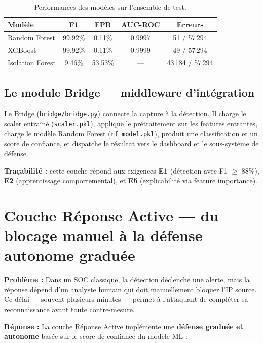 \documentclass[12pt,a4paper]{article}
\newcommand{\problem}{\textcolor{accentred}{\textbf{Probl\`{e}me : }}}
\newcommand{\answer}{\textcolor{accentgreen}{\textbf{R\'{e}ponse : }}}
\begin{document}
\begin{table}[h!]
\centering
\small
\begin{tabular}{lcccc}
\toprule
\textbf{Mod\`{e}le} & \textbf{F1} & \textbf{FPR} & \textbf{AUC-ROC} & \textbf{Erreurs} \\
\midrule
Random Forest & 99.92\% & 0.11\% & 0.9997 & 51 / 57\,294 \\
XGBoost       & 99.92\% & 0.11\% & 0.9999 & 49 / 57\,294 \\
Isolation Forest & 9.46\% & 53.53\% & --- & 43\,184 / 57\,294 \\
\bottomrule
\end{tabular}
\caption{Performances des mod\`{e}les sur l'ensemble de test.}
\end{table}

\subsection{Le module Bridge --- middleware d'int\'{e}gration}

Le Bridge (\texttt{bridge/bridge.py}) connecte la capture \`{a} la d\'{e}tection.
Il charge le scaler entra\^{i}n\'{e} (\texttt{scaler.pkl}), applique le
pr\'{e}traitement sur les features entrantes, charge le mod\`{e}le Random Forest
(\texttt{rf\_model.pkl}), produit une classification et un score de confiance,
et dispatche le r\'{e}sultat vers le dashboard et le sous-syst\`{e}me de d\'{e}fense.

\bigskip
\noindent \textbf{Tra\c{c}abilit\'{e} :} cette couche r\'{e}pond aux exigences
\textbf{E1} (d\'{e}tection avec F1 $\geq$ 88\%), \textbf{E2} (apprentissage
comportemental), et \textbf{E5} (explicabilit\'{e} via feature importance).

\section{Couche R\'{e}ponse Active --- du blocage manuel \`{a} la d\'{e}fense autonome gradu\'{e}e}

\problem Dans un SOC classique, la d\'{e}tection d\'{e}clenche une alerte,
mais la r\'{e}ponse d\'{e}pend d'un analyste humain qui doit manuellement
bloquer l'IP source. Ce d\'{e}lai --- souvent plusieurs minutes --- permet
\`{a} l'attaquant de compl\'{e}ter sa reconnaissance avant toute contre-mesure.

\answer La couche R\'{e}ponse Active impl\'{e}mente une \textbf{d\'{e}fense
gradu\'{e}e et autonome} bas\'{e}e sur le score de confiance du mod\`{e}le ML :
\end{document}
